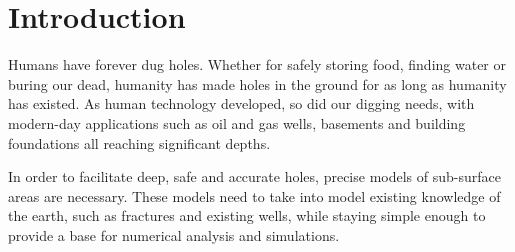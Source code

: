 \section{Introduction}
Humans have forever dug holes. Whether for safely storing food, finding water or buring our dead, humanity has made holes in the ground for as long as humanity has existed. As human technology developed, so did our digging needs, with modern-day applications such as oil and gas wells, basements and building foundations all reaching significant depths.

In order to facilitate deep, safe and accurate holes, precise models of sub-surface areas are necessary. These models need to take into model existing knowledge of the earth, such as fractures and existing wells, while staying simple enough to provide a base for numerical analysis and simulations. %




